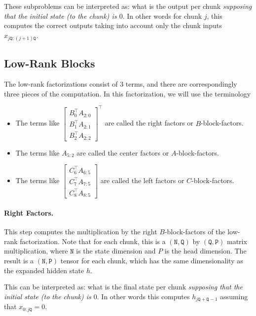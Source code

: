 These subproblems can be interpreted as: what is the output per chunk \emph{supposing that the initial state (to the chunk) is $0$}.
In other words for chunk $j$, this computes the correct outputs taking into account only the chunk inputs $x_{j\mathtt{Q}:(j+1)\mathtt{Q}}$.

\subsection{Low-Rank Blocks}

The low-rank factorizations consist of 3 terms, and there are correspondingly three pieces of the computation.
In this factorization, we will use the terminology
\begin{itemize}
  \item The terms like $\begin{bmatrix}B_0^{\top} A_{2:0} \\[1pt] B_1^{\top}A_{2:1} \\[1pt] B_2^{\top}A_{2:2}\end{bmatrix}^{\top}$ are called the right factors or $B$-block-factors.
  \item The terms like $A_{5:2}$ are called the center factors or $A$-block-factors.
  \item The terms like $\begin{bmatrix}C_6^{\top} A_{6:5} \\[1pt] C_7^{\top} A_{7:5} \\[1pt] C_8^{\top} A_{8:5}\end{bmatrix}$ are called the left factors or $C$-block-factors.
\end{itemize}


\paragraph{Right Factors.}

This step computes the multiplication by the right $B$-block-factors of the low-rank factorization.
Note that for each chunk, this is a $(\mathtt{N}, \mathtt{Q})$ by $(\mathtt{Q}, \mathtt{P})$ matrix multiplication, where $\mathtt{N}$ is the state dimension and $P$ is the head dimension.
The result is a $(\mathtt{N}, \mathtt{P})$ tensor for each chunk, which has the same dimensionality as the expanded hidden state $h$.

This can be interpreted as: what is the final state per chunk \emph{supposing that the initial state (to the chunk) is $0$}.
In other words this computes $h_{j\mathtt{Q}+\mathtt{Q}-1}$ assuming that $x_{0:j\mathtt{Q}} = 0$.

